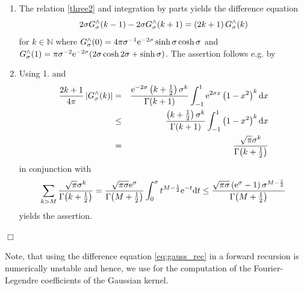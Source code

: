 \documentclass[11pt,a4paper,twoside,bibtotoc]{scrartcl}
\theoremstyle{plain}
\theoremstyle{definition}
\theoremstyle{remark}
\newenvironment{proof}{{\bf Proof.}}{$\Box$}
\newcommand{\N}{\ensuremath{\mathbb{N}}}
\newcommand{\abs}[1]{\ensuremath{\left\vert#1\right\vert}}
\newcommand{\fun}[2]{\ensuremath{#1{\hspace{-0.4ex}}\left(#2\right)}}
\newcommand{\dx}{\text{\rm{d}}}
\newcommand{\e}{\mbox{\rm{e}}}
\numberwithin{equation}{section}
\numberwithin{table}{section}
\numberwithin{figure}{section}
\begin{document}
\begin{proof}
  \begin{enumerate}
  \item The relation \eqref{three2} and integration by parts yields the
    difference equation
    \begin{equation}\label{eq:gauss_rec}
    {2\sigma}\fun{G_{\sigma}^{\wedge}}{k-1} - {2\sigma}\fun{G_{\sigma}^{\wedge}}{k+1} = 
    \left(2k+1\right)\fun{G_{\sigma}^{\wedge}}{k}
    \end{equation}
    for $k\in \N$ where $\fun{G_{\sigma}^{\wedge}}{0} = 4 \pi \sigma^{-1}
    \e^{-2\sigma} \sinh \sigma \cosh \sigma$ and
    $\fun{G_{\sigma}^{\wedge}}{1} = \pi \sigma^{-2} \e^{-2\sigma} (2 \sigma
    \cosh 2 \sigma + \sinh \sigma )$.
    The assertion follows e.g. by \cite{bahu01,XXX???}
  \item Using 1. and
  \begin{eqnarray*}
    \frac{2k+1}{4\pi} \abs{\fun{G_{\sigma}^{\wedge}}{k}}
    &=&
    \frac{\e^{-2\sigma}
    \left(k+\frac{1}{2}\right)\sigma^k}{\fun{\Gamma}{k+1}} \int_{-1}^{1}
    \e^{2\sigma x} \left(1-x^2\right)^k \dx x\\
    &\le&
    \frac{\left(k+\frac{1}{2}\right)\sigma^k}{\fun{\Gamma}{k+1}}
    \int_{-1}^{1} \left(1-x^2\right)^k \dx x\\
    &=&
    \frac{\sqrt{\pi}\sigma^k}{\fun{\Gamma}{k+\frac{1}{2}}}
  \end{eqnarray*}
  in conjunction with
  \begin{equation*}
    \sum_{k>M} \frac{\sqrt{\pi}\sigma^k}{\fun{\Gamma}{k+\frac{1}{2}}}\\
    =
    \frac{\sqrt{\pi\sigma}\e^{\sigma}}{\fun{\Gamma}{M+\frac{1}{2}}} 
    \int_{0}^{\sigma} t^{M-\frac{1}{2}} \e^{-t} \dx t\\
    \le
    \frac{\sqrt{\pi\sigma}\left(\e^{\sigma}-1\right)
    \sigma^{M-\frac{1}{2}}}{\fun{\Gamma}{M+\frac{1}{2}}}
  \end{equation*}
  yields the assertion.
\end{enumerate}
\end{proof}

Note, that using the difference equation \eqref{eq:gauss_rec} in a forward
recursion is numerically unstable and hence, we use \cite{XXX} for the
computation of the Fourier-Legendre coefficients of the Gaussian kernel.
\end{document}

